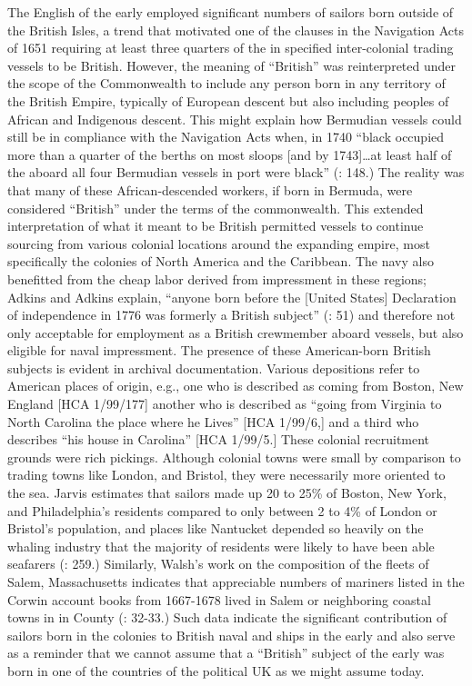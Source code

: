 The English  of the early  employed significant numbers of sailors born outside of the British Isles, a trend that motivated one of the clauses in the Navigation Acts of 1651 requiring at least three quarters of the  in specified inter-colonial trading vessels to be British. However, the meaning of “British” was reinterpreted under the scope of the Commonwealth to include any person born in any territory of the British Empire, typically of European descent but also including peoples of African and Indigenous descent. This might explain how Bermudian vessels could still be in compliance with the Navigation Acts when, in 1740 “black  occupied more than a quarter of the berths on most sloops [and by 1743]…at least half of the  aboard all four Bermudian vessels in port were black” (\citealt{Jarvis2010}: 148.) The reality was that many of these African-descended workers, if born in Bermuda, were considered “British” under the terms of the commonwealth. This extended interpretation of what it meant to be British permitted  vessels to continue sourcing  from various colonial locations around the expanding empire, most specifically the colonies of North America and the Caribbean. The navy also benefitted from the cheap labor derived from impressment in these regions; Adkins and Adkins explain, “anyone born before the [United States] Declaration of independence in 1776 was formerly a British subject” (\citeyear*{AdkinsAdkins2008}: 51) and therefore not only acceptable for employment as a British crewmember aboard  vessels, but also eligible for naval impressment. The presence of these American-born British subjects is evident in archival documentation. Various depositions refer to American places of origin, e.g., one  who is described as coming from Boston, New England [HCA 1/99/177] another who is described as “going from Virginia to North Carolina the place where he Lives” [HCA 1/99/6,] and a third who describes “his house in Carolina” [HCA 1/99/5.] These colonial recruitment grounds were rich pickings. Although colonial towns were small by comparison to trading towns like London,  and Bristol, they were necessarily more oriented to the sea. Jarvis estimates that sailors made up 20 to 25\% of Boston, New York, and Philadelphia’s residents compared to only between 2 to 4\% of London or Bristol’s population, and places like Nantucket depended so heavily on the whaling industry that the majority of residents were likely to have been able seafarers (\citealt{Jarvis2010}: 259.) Similarly, Walsh’s work on the composition of the  fleets of Salem, Massachusetts indicates that appreciable numbers of mariners listed in the Corwin account books from 1667-1678 lived in Salem or neighboring coastal towns in in  County (\citealt{Walsh1994}: 32-33.) Such data indicate the significant contribution of sailors born in the colonies to British naval and  ships in the early  and also serve as a reminder that we cannot assume that a “British” subject of the early  was born in one of the countries of the political UK as we might assume today. 

